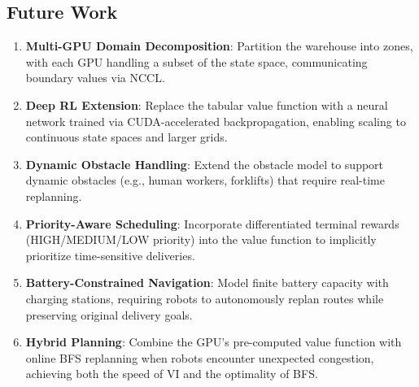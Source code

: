 \documentclass[12pt,a4paper]{article}
\begin{document}
\subsection{Future Work}
\begin{enumerate}
    \item \textbf{Multi-GPU Domain Decomposition}: Partition the warehouse into zones, with each GPU handling a subset of the state space, communicating boundary values via NCCL.
    \item \textbf{Deep RL Extension}: Replace the tabular value function with a neural network trained via CUDA-accelerated backpropagation, enabling scaling to continuous state spaces and larger grids.
    \item \textbf{Dynamic Obstacle Handling}: Extend the obstacle model to support dynamic obstacles (e.g., human workers, forklifts) that require real-time replanning.
    \item \textbf{Priority-Aware Scheduling}: Incorporate differentiated terminal rewards (HIGH/MEDIUM/LOW priority) into the value function to implicitly prioritize time-sensitive deliveries.
    \item \textbf{Battery-Constrained Navigation}: Model finite battery capacity with charging stations, requiring robots to autonomously replan routes while preserving original delivery goals.
    \item \textbf{Hybrid Planning}: Combine the GPU's pre-computed value function with online BFS replanning when robots encounter unexpected congestion, achieving both the speed of VI and the optimality of BFS.
\end{enumerate}

\newpage
{}


\end{document}
